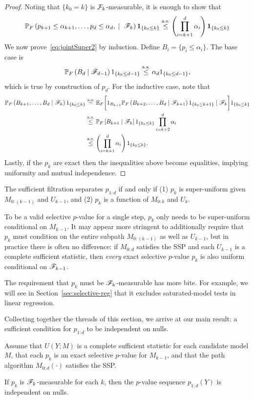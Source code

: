 \documentclass{article}
\begin{document}
\begin{proof}
  Noting that $\{k_0=k\}$ is $\mathcal{F}_k$-measurable, it is enough to show that 
  \begin{equation}\label{eq:jointSuper2}
  \mathbb{P}_F\left(p_{k+1}\leq \alpha_{k+1}, \ldots, p_d \leq \alpha_d, \;
    \mid\; \mathscr{F}_k\right)\mathbf{1}_{\{k_0\leq k\}} \overset{\textrm{a.s.}}{\leq} \left(\prod_{i=k+1}^d
  \alpha_i\right)\mathbf{1}_{\{k_0\leq k\}}
  \end{equation}
  We now prove~\eqref{eq:jointSuper2} by induction. Define $B_i = \{p_i \leq \alpha_i\}$. The base case is
  \[
  \mathbb{P}_F\left(B_d \mid \mathscr{F}_{d-1}\right)1_{\{k_0 \leq d-1\}} \overset{\textrm{a.s.}}{\leq} \alpha_d
1_{\{k_0 \leq d-1\}},
  \]
  which is true by construction of $p_d$. 
  For the inductive case, note that 
  \begin{align*}
    \mathbb{P}_F\left(B_{k+1}, \ldots, B_d
      \mid \mathscr{F}_k\right)1_{\{k_0 \leq k\}} 
    &\overset{\textrm{a.s.}}{=} \mathbb{E}_F\bigg[ 1_{B_{k+1}} 
    \mathbb{P}_F\left(B_{k+2}, \ldots, B_d
      \mid \mathscr{F}_{k+1}\right)1_{\{k_0 \leq k+1\}}
    \mid \mathscr{F}_k\bigg]1_{\{k_0 \leq k\}}\\
    &\overset{\textrm{a.s.}}{\leq} \mathbb{P}_F\left[ B_{k+1}
      \mid \mathscr{F}_k\right]1_{\{k_0 \leq k\}}\prod_{i=k+2}^d \alpha_i \\
    &\overset{\textrm{a.s.}}{\leq} \left(\prod_{i=k+1}^d \alpha_i \right)1_{\{k_0 \leq k\}} .
  \end{align*}
Lastly, if the $p_k$ are exact then the inequalities above become equalities, implying uniformity and mutual independence.
\end{proof}

The sufficient filtration separates $p_{1:d}$ if and only if (1) $p_k$ is super-uniform given $M_{0:(k-1)}$ and $U_{k-1}$, and (2) $p_k$ is a function of $M_{0:k}$ and $U_k$.

To be a valid selective $p$-value for a single step, $p_k$ only needs to be super-uniform conditional on $M_{k-1}$. It may appear more stringent to additionally require that $p_k$ must condition on the entire subpath $M_{0:(k-1)}$ as well as $U_{k-1}$, but in practice there is often no difference: if $M_{0:d}$ satisfies the SSP and each $U_{k-1}$ is a complete sufficient statistic, then {\em every} exact selective $p$-value $p_k$ is also uniform conditional on $\mathscr{F}_{k-1}$.

The requirement that $p_k$ must be $\mathscr{F}_k$-measurable has more bite. For example, we will see in Section~\ref{sec:selective-reg} that it excludes saturated-model tests in linear regression.

Collecting together the threads of this section, we arrive at our main result: a sufficient condition for $p_{1:d}$ to be independent on nulls.
\begin{theorem} \label{thm:suffCond}
Assume that $U(Y; M)$ is a complete sufficient statistic for each candidate model $M$, that each $p_k$ is an exact selective $p$-value for $M_{k-1}$, and that the path algorithm $M_{0:d}(\cdot)$ satisfies the SSP.

If $p_k$ is $\mathscr{F}_k$-measurable for each $k$, then the $p$-value sequence $p_{1:d}(Y)$ is independent on nulls.
\end{theorem}
\end{document}

